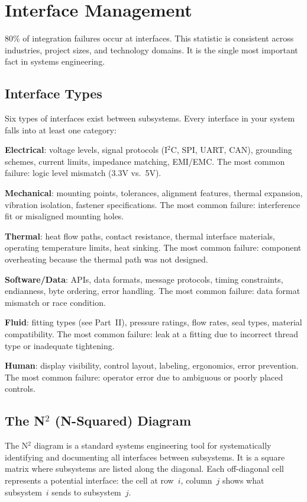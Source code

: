 \documentclass[11pt,letterpaper,twoside,openany]{book}
\begin{document}
\FloatBarrier
\section{Interface Management}
80\% of integration failures occur at interfaces. This statistic is consistent across industries, project sizes, and technology domains. It is the single most important fact in systems engineering.

\subsection{Interface Types}
Six types of interfaces exist between subsystems. Every interface in your system falls into at least one category:

\textbf{Electrical}: voltage levels, signal protocols (I$^2$C, SPI, UART, CAN), grounding schemes, current limits, impedance matching, EMI/EMC. The most common failure: logic level mismatch (3.3V vs.\ 5V).

\textbf{Mechanical}: mounting points, tolerances, alignment features, thermal expansion, vibration isolation, fastener specifications. The most common failure: interference fit or misaligned mounting holes.

\textbf{Thermal}: heat flow paths, contact resistance, thermal interface materials, operating temperature limits, heat sinking. The most common failure: component overheating because the thermal path was not designed.

\textbf{Software/Data}: APIs, data formats, message protocols, timing constraints, endianness, byte ordering, error handling. The most common failure: data format mismatch or race condition.

\textbf{Fluid}: fitting types (see Part~II), pressure ratings, flow rates, seal types, material compatibility. The most common failure: leak at a fitting due to incorrect thread type or inadequate tightening.

\textbf{Human}: display visibility, control layout, labeling, ergonomics, error prevention. The most common failure: operator error due to ambiguous or poorly placed controls.

\subsection{The N$^2$ (N-Squared) Diagram}
The N$^2$ diagram is a standard systems engineering tool for systematically identifying and documenting all interfaces between subsystems. It is a square matrix where subsystems are listed along the diagonal. Each off-diagonal cell represents a potential interface: the cell at row~$i$, column~$j$ shows what subsystem~$i$ sends to subsystem~$j$.
\end{document}
